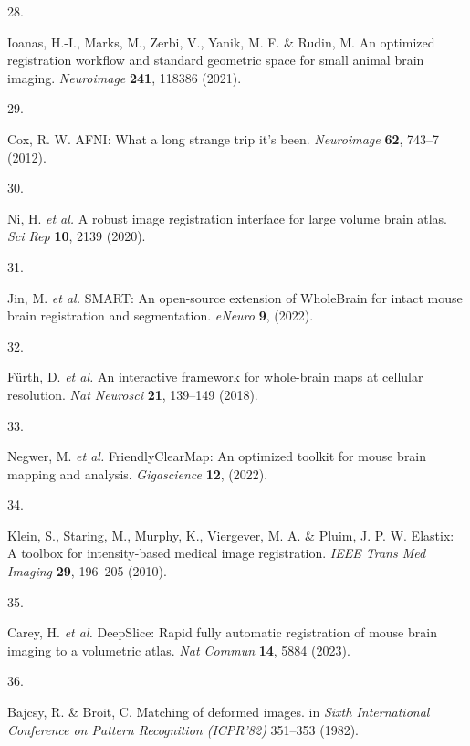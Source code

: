 \documentclass[
  12pt,
]{article}
\newlength{\cslhangindent}
\newlength{\csllabelwidth}
\newenvironment{CSLReferences}[2] %
 {%
  \setlength{\parindent}{0pt}
  \ifodd #1 \everypar{\setlength{\hangindent}{\cslhangindent}}\ignorespaces\fi
  \ifnum #2 > 0
  \setlength{\parskip}{#2\baselineskip}
  \fi
 }%
 {}
\newcommand{\CSLLeftMargin}[1]{\parbox[t]{\csllabelwidth}{#1}}
\newcommand{\CSLRightInline}[1]{\parbox[t]{\linewidth - \csllabelwidth}{#1}\break}
\begin{document}
\begin{CSLReferences}{0}{0}
\leavevmode{}%
\CSLLeftMargin{28. }
\CSLRightInline{Ioanas, H.-I., Marks, M., Zerbi, V., Yanik, M. F. \&
Rudin, M. An optimized registration workflow and standard geometric
space for small animal brain imaging. \emph{Neuroimage} \textbf{241},
118386 (2021).}

\leavevmode{}%
\CSLLeftMargin{29. }
\CSLRightInline{Cox, R. W. {AFNI}: What a long strange trip it's been.
\emph{Neuroimage} \textbf{62}, 743--7 (2012).}

\leavevmode{}%
\CSLLeftMargin{30. }
\CSLRightInline{Ni, H. \emph{et al.} A robust image registration
interface for large volume brain atlas. \emph{Sci Rep} \textbf{10}, 2139
(2020).}

\leavevmode{}%
\CSLLeftMargin{31. }
\CSLRightInline{Jin, M. \emph{et al.} SMART: An open-source extension of
WholeBrain for intact mouse brain registration and segmentation.
\emph{eNeuro} \textbf{9}, (2022).}

\leavevmode{}%
\CSLLeftMargin{32. }
\CSLRightInline{Fürth, D. \emph{et al.} An interactive framework for
whole-brain maps at cellular resolution. \emph{Nat Neurosci}
\textbf{21}, 139--149 (2018).}

\leavevmode{}%
\CSLLeftMargin{33. }
\CSLRightInline{Negwer, M. \emph{et al.} FriendlyClearMap: An optimized
toolkit for mouse brain mapping and analysis. \emph{Gigascience}
\textbf{12}, (2022).}

\leavevmode{}%
\CSLLeftMargin{34. }
\CSLRightInline{Klein, S., Staring, M., Murphy, K., Viergever, M. A. \&
Pluim, J. P. W. Elastix: A toolbox for intensity-based medical image
registration. \emph{IEEE Trans Med Imaging} \textbf{29}, 196--205
(2010).}

\leavevmode{}%
\CSLLeftMargin{35. }
\CSLRightInline{Carey, H. \emph{et al.} DeepSlice: Rapid fully automatic
registration of mouse brain imaging to a volumetric atlas. \emph{Nat
Commun} \textbf{14}, 5884 (2023).}

\leavevmode{}%
\CSLLeftMargin{36. }
\CSLRightInline{Bajcsy, R. \& Broit, C. Matching of deformed images. in
\emph{{S}ixth {I}nternational {C}onference on {P}attern {R}ecognition
({ICPR}'82)} 351--353 (1982).}


\end{CSLReferences}
\end{document}
